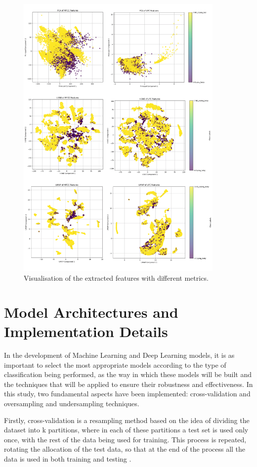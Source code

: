 \begin{figure}[H]
\centering
    \includegraphics[width=0.9\textwidth]{figures/pca-tsne-umap.png}
\caption{Visualisation of the extracted features with different metrics.}
\label{fig:pca-tsne-umap}
\end{figure}

\section{Model Architectures and Implementation Details}

In the development of Machine Learning and Deep Learning models, it is as important to select the most appropriate models according to the type of classification being performed, as the way in which these models will be built and the techniques that will be applied to ensure their robustness and effectiveness. In this study, two fundamental aspects have been implemented: cross-validation and oversampling and undersampling techniques. 

Firstly, cross-validation is a resampling method based on the idea of dividing the dataset into k partitions, where in each of these partitions a test set is used only once, with the rest of the data being used for training. This process is repeated, rotating the allocation of the test data, so that at the end of the process all the data is used in both training and testing \cite{berrar2019cross}. 

